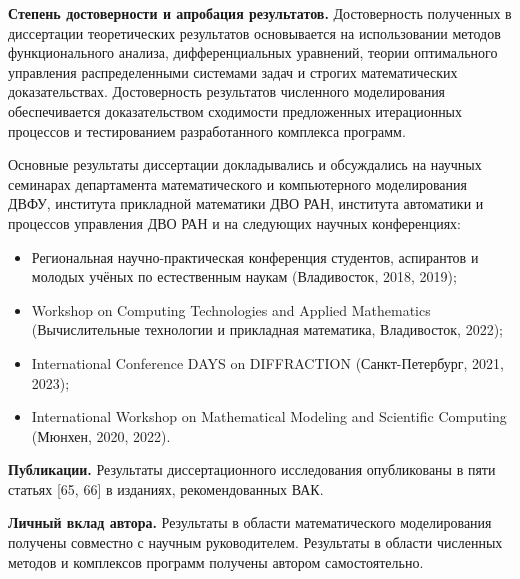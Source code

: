 \textbf{Степень достоверности и апробация результатов.}
Достоверность полученных в диссертации теоретических результатов основывается на
использовании методов функционального анализа, дифференциальных
уравнений, теории оптимального управления распределенными системами
задач и строгих математических доказательствах.
Достоверность результатов численного моделирования обеспечивается
доказательством сходимости предложенных итерационных процессов
и тестированием разработанного комплекса программ.

Основные результаты диссертации докладывались и обсуждались на
научных семинарах департамента математического и компьютерного моделирования
ДВФУ, института прикладной математики ДВО РАН, института автоматики
и процессов управления ДВО РАН и на следующих научных конференциях:
\begin{itemize}[leftmargin=5.5mm]
    \item Региональная научно-практическая конференция студентов, аспирантов
    и молодых учёных по естественным наукам (Владивосток, 2018, 2019);
    \item Workshop on Computing Technologies and Applied Mathematics
(Вычислительные технологии и прикладная математика, Владивосток, 2022);
    \item International Conference DAYS on DIFFRACTION (Санкт-Петербург, 2021, 2023);
    \item International Workshop on Mathematical Modeling and Scientific Computing (Мюнхен, 2020, 2022).
\end{itemize}


\textbf{Публикации.}
Результаты диссертационного исследования опубликованы в пяти статьях
[65, 66] в изданиях, рекомендованных ВАК.


\textbf{Личный вклад автора.}
Результаты в области математического моделирования получены совместно с научным руководителем.
Результаты в области численных методов и комплексов программ получены автором самостоятельно.
